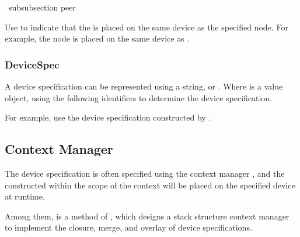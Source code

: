 \begin{content}
\ subsubsection {peer}

Use  to indicate that the  is placed on the same device as the specified node. For example, the node is placed on the same device as .


\subsubsection{DeviceSpec}

A device specification can be represented using a string, or . Where  is a value object, using the following  identifiers to determine the device specification.

\begin{enum}
\end{enum}

For example, use the device specification constructed by .


\subsection{Context Manager}

The  device specification is often specified using the context manager , and the  constructed within the scope of the context will be placed on the specified device at runtime.


Among them,  is a method of , which designs a stack structure context manager to implement the closure, merge, and overlay of device specifications.


\end{content}
